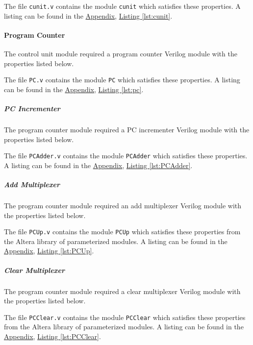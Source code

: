
The file \verb|cunit.v| contains the module \verb|cunit| which satisfies these properties.
A listing can be found in the \hyperref[sec:appendix]{Appendix}, \hyperref[lst:cunit]{Listing \ref*{lst:cunit}}.

\paragraph{Program Counter} \label{par:pc}

The control unit module required a program counter Verilog module with the properties listed below.


The file \verb|PC.v| contains the module \verb|PC| which satisfies these properties.
A listing can be found in the \hyperref[sec:appendix]{Appendix}, \hyperref[lst:pc]{Listing \ref*{lst:pc}}.

\subparagraph{PC Incrementer}

The program counter module required a PC incrementer Verilog module with the properties listed below.


The file \verb|PCAdder.v| contains the module \verb|PCAdder| which satisfies these properties.
A listing can be found in the \hyperref[sec:appendix]{Appendix}, \hyperref[lst:PCAdder]{Listing \ref*{lst:PCAdder}}.

\subparagraph{Add Multiplexer}

The program counter module required an add multiplexer Verilog module with the properties listed below.


The file \verb|PCUp.v| contains the module \verb|PCUp| which satisfies these properties from the Altera library of parameterized modules.
A listing can be found in the \hyperref[sec:appendix]{Appendix}, \hyperref[lst:PCUp]{Listing \ref*{lst:PCUp}}.

\subparagraph{Clear Multiplexer}

The program counter module required a clear multiplexer Verilog module with the properties listed below.


The file \verb|PCClear.v| contains the module \verb|PCClear| which satisfies these properties from the Altera library of parameterized modules.
A listing can be found in the \hyperref[sec:appendix]{Appendix}, \hyperref[lst:PCClear]{Listing \ref*{lst:PCClear}}.

